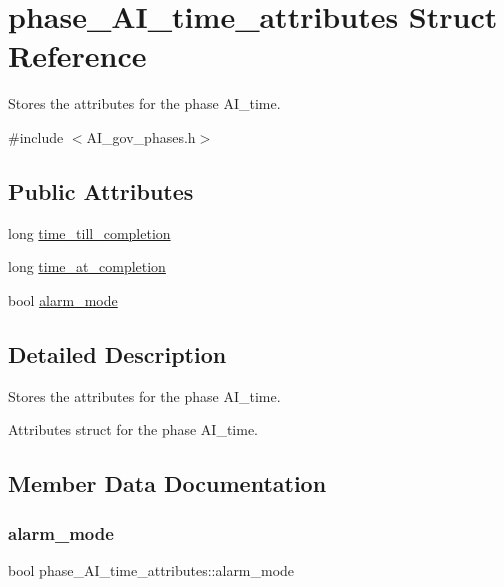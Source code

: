 \hypertarget{structphase__AI__time__attributes}{}\section{phase\+\_\+\+A\+I\+\_\+time\+\_\+attributes Struct Reference}
\label{structphase__AI__time__attributes}


Stores the attributes for the phase A\+I\+\_\+time.  




{\ttfamily \#include $<$A\+I\+\_\+gov\+\_\+phases.\+h$>$}

\subsection*{Public Attributes}
\begin{DoxyCompactItemize}
\item 
long \hyperlink{structphase__AI__time__attributes_acab81a528eec61df42a542d70ea8fabb}{time\+\_\+till\+\_\+completion}
\item 
long \hyperlink{structphase__AI__time__attributes_a6cceb788e34974005d150701d5f3771e}{time\+\_\+at\+\_\+completion}
\item 
bool \hyperlink{structphase__AI__time__attributes_a68d606714d125d9fe772852dfa49fa15}{alarm\+\_\+mode}
\end{DoxyCompactItemize}


\subsection{Detailed Description}
Stores the attributes for the phase A\+I\+\_\+time. 

Attributes struct for the phase A\+I\+\_\+time. 

\subsection{Member Data Documentation}
\mbox{\label{structphase__AI__time__attributes_a68d606714d125d9fe772852dfa49fa15}} 
\subsubsection{\texorpdfstring{alarm\+\_\+mode}{alarm\_mode}}
{\footnotesize\ttfamily bool phase\+\_\+\+A\+I\+\_\+time\+\_\+attributes\+::alarm\+\_\+mode}

